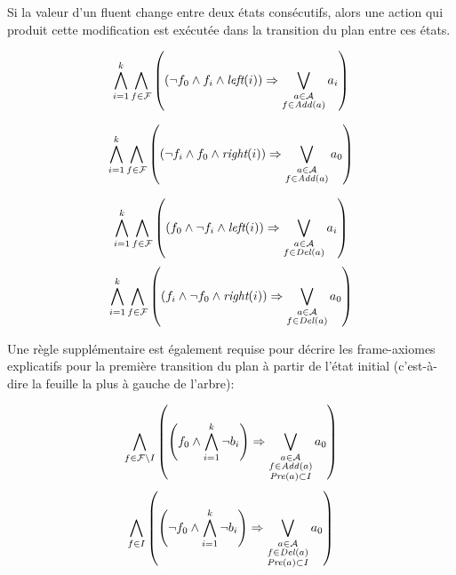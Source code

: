 Si la valeur d'un fluent change entre deux états consécutifs, alors une action qui produit cette modification est exécutée dans la transition du plan entre ces états.

\begin{small}
\[ \bigwedge\limits_{\substack{i=1}}^{k} \bigwedge\limits_{\substack{f\in \mathcal{F}}}
\left(\left(\neg f_{0} \wedge f_{i} \wedge \textit{left}(i) \right) \Rightarrow \bigvee\limits_{\substack{\substack{a \in \mathcal{A} \\ f \in \mathit{Add}(a)}}} a_{i}\right)\]

\[ \bigwedge\limits_{\substack{i=1}}^{k} \bigwedge\limits_{\substack{f\in \mathcal{F}}}
\left(\left(\neg f_{i} \wedge f_{0} \wedge \textit{right}(i) \right) \Rightarrow \bigvee\limits_{\substack{\substack{a \in \mathcal{A} \\ f \in \mathit{Add}(a)}}} a_{0}\right)\]
\end{small}

\begin{small}
\[ \bigwedge\limits_{\substack{i=1}}^{k} \bigwedge\limits_{\substack{f\in \mathcal{F}}}
\left(\left(f_{0} \wedge \neg f_{i} \wedge \textit{left}(i) \right) \Rightarrow \bigvee\limits_{\substack{\substack{a \in \mathcal{A} \\ f \in \mathit{Del}(a)}}} a_{i}\right)\]
\[ \bigwedge\limits_{\substack{i=1}}^{k} \bigwedge\limits_{\substack{f\in \mathcal{F}}}
\left(\left(f_{i} \wedge \neg f_{0} \wedge \textit{right}(i) \right) \Rightarrow \bigvee\limits_{\substack{\substack{a \in \mathcal{A} \\ f \in \mathit{Del}(a)}}} a_{0}\right)\]
\end{small}

Une règle supplémentaire est également requise pour décrire les frame-axiomes explicatifs pour la première transition du plan à partir de l'état initial (c'est-à-dire la feuille la plus à gauche de l'arbre):

\[ \bigwedge\limits_{\substack{f\in \mathcal{F}\setminus I}} \left(\left(f_{0}\wedge \bigwedge\limits_{\substack{i=1}}^{k}\neg b_{i}\right) \Rightarrow \bigvee\limits_{\substack{a\in \mathcal{A}\\ f\in\mathit{Add}(a)\\\mathit{Pre}(a) \subset I}} {a}_{0} \right) \]
\[ \bigwedge\limits_{\substack{f\in I}} \left(\left(\neg f_{0}\wedge \bigwedge\limits_{\substack{i=1}}^{k}\neg b_{i}\right) \Rightarrow \bigvee\limits_{\substack{a\in \mathcal{A}\\ f\in\mathit{Del}(a)\\\mathit{Pre}(a) \subset I}} {a}_{0} \right) \]


